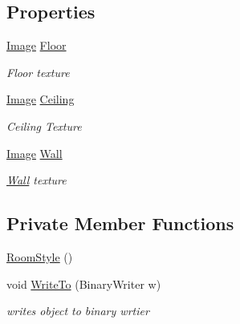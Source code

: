 \subsection*{Properties}
\begin{DoxyCompactItemize}
\item 
\mbox{\hyperlink{class_virt_muse_web_1_1_utility_1_1_image}{Image}} \mbox{\hyperlink{class_virt_muse_web_1_1_utility_1_1_room_style_aa1ccea2203d9dda51e415a6485f85c92}{Floor}}
\begin{DoxyCompactList}\small\item\em Floor texture \end{DoxyCompactList}\item 
\mbox{\hyperlink{class_virt_muse_web_1_1_utility_1_1_image}{Image}} \mbox{\hyperlink{class_virt_muse_web_1_1_utility_1_1_room_style_a50a8741600bf01fef60635774a9f76ba}{Ceiling}}
\begin{DoxyCompactList}\small\item\em Ceiling Texture \end{DoxyCompactList}\item 
\mbox{\hyperlink{class_virt_muse_web_1_1_utility_1_1_image}{Image}} \mbox{\hyperlink{class_virt_muse_web_1_1_utility_1_1_room_style_a851a1206375da8ac649ab6675aae47c8}{Wall}}
\begin{DoxyCompactList}\small\item\em \mbox{\hyperlink{class_wall}{Wall}} texture \end{DoxyCompactList}\end{DoxyCompactItemize}
\subsection*{Private Member Functions}
\begin{DoxyCompactItemize}
\item 
\mbox{\hyperlink{class_virt_muse_web_1_1_utility_1_1_room_style_a15a52781f79aa70277b84ded83ff6d9d}{Room\+Style}} ()
\item 
void \mbox{\hyperlink{class_virt_muse_web_1_1_utility_1_1_room_style_a68495fa433a85c72f42cc6505d3b05a3}{Write\+To}} (Binary\+Writer w)
\begin{DoxyCompactList}\small\item\em writes object to binary wrtier \end{DoxyCompactList}\end{DoxyCompactItemize}
